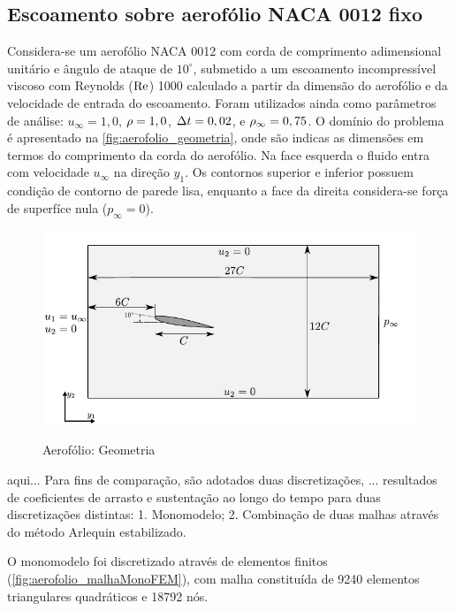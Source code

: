 \subsection{Escoamento sobre aerofólio NACA 0012 fixo} \label{capitulo:Cap6:Exemplos:NACA0012}

Considera-se um aerofólio NACA 0012 com corda de comprimento adimensional unitário e ângulo de ataque de $10^{\circ}$, submetido a um escoamento incompressível viscoso com Reynolds ($\mathrm{Re}$) 1000 calculado a partir da dimensão do aerofólio e da velocidade de entrada do escoamento. Foram utilizados ainda como parâmetros de análise: $u_{\infty} = 1,0$,  $\rho = 1,0$,  $\Delta t = 0,02$, e $\rho_\infty = 0,75$. O domínio do problema é apresentado na \autoref{fig:aerofolio_geometria}, onde são indicas as dimensões em termos do comprimento da corda do aerofólio. Na face esquerda o fluido entra com velocidade $u_{\infty}$ na direção $y_1$. Os contornos superior e inferior possuem condição de contorno de parede lisa, enquanto a face da direita considera-se força de superfíce nula ($p_\infty=0$). 

\begin{figure}[!htbp]
	\caption{Aerofólio: Geometria}
	\centering 
	{\includegraphics[scale=1.0,trim=0cm 0cm 0cm 0cm, clip=true]{Imagens/Cap6/aerofolio_geometria.pdf}}	
	\label{fig:aerofolio_geometria}
\end{figure}

\parei aqui...
Para fins de comparação, são adotados duas discretizações, ... resultados de coeficientes de arrasto e sustentação ao longo do tempo para duas discretizações distintas: 1. Monomodelo; 2. Combinação de duas malhas através do método Arlequin estabilizado.

O monomodelo foi discretizado através de elementos finitos (\autoref{fig:aerofolio_malhaMonoFEM}), com malha constituída de 9240 elementos triangulares quadráticos e 18792 nós. 

